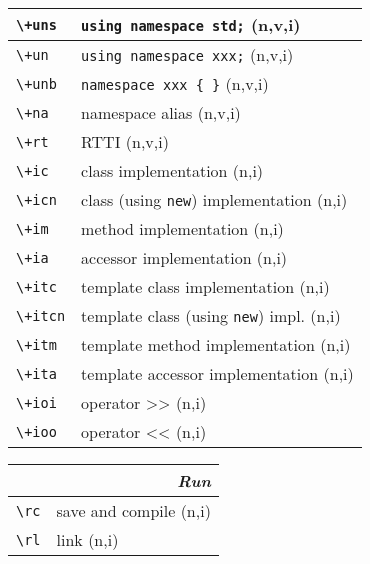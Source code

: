 \documentclass[oneside,11pt,landscape,DIV16]{scrartcl}
\begin{document}
\begin{multicols}{3}
\begin{center}
\begin{tabular}[]{|p{12mm}|p{60mm}|}
\hline \verb'\+uns' & \verb'using namespace std;'          \hfill (n,v,i)\\
\hline \verb'\+un'  & \verb'using namespace xxx;'          \hfill (n,v,i)\\
\hline \verb'\+unb' & \verb'namespace xxx { }'             \hfill (n,v,i)\\
\hline \verb'\+na'  & namespace alias                      \hfill (n,v,i)\\
\hline \verb'\+rt'  & RTTI                                 \hfill (n,v,i)\\
%
\hline
\hline \verb'\+ic'  & class  implementation                   \hfill (n,i)\\
\hline \verb'\+icn' & class (using \verb'new') implementation \hfill (n,i)\\
\hline \verb'\+im'  & method implementation                   \hfill (n,i)\\
\hline \verb'\+ia'  & accessor implementation                 \hfill (n,i)\\
\hline \verb'\+itc' & template class  implementation          \hfill (n,i)\\
\hline \verb'\+itcn'& template class (using \verb'new') impl. \hfill (n,i)\\
\hline \verb'\+itm' & template method implementation          \hfill (n,i)\\
\hline \verb'\+ita' & template accessor implementation        \hfill (n,i)\\
\hline \verb'\+ioi' & operator >>                             \hfill (n,i)\\
\hline \verb'\+ioo' & operator <<                             \hfill (n,i)\\
\hline 
\end{tabular}
%
\vspace{100mm}
\begin{tabular}[]{|p{12mm}|p{58mm}|}
\hline
\multicolumn{2}{|r|}{\textsl{\textbf{R}un}} \\
\hline \verb'\rc'  & save and compile                        \hfill (n,i)\\
\hline \verb'\rl'  & link                                    \hfill (n,i)\\

\end{tabular}
\end{center}
\end{multicols}
\end{document}
